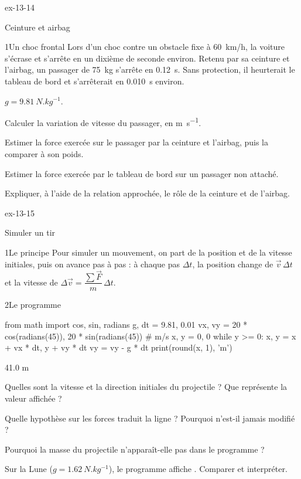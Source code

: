 \begin{blocLivre}{ex-13-14}
\begin{exercice}[3]{Ceinture et airbag}
\begin{docu}{1}{Un choc frontal}
Lors d'un choc contre un obstacle fixe à \qty{60}{km/h}, la voiture s'écrase et s'arrête en un dixième de seconde environ. Retenu par
sa ceinture et l'airbag, un passager de \qty{75}{kg} s'arrête en \qty{0,12}{s}. Sans protection, il heurterait le tableau de bord et s'arrêterait en
\qty{0,010}{s} environ.
\end{docu}
\begin{donnees}
$g=\qty{9,81}{N.kg^{-1}}$.
\end{donnees}
\begin{questions}
\item Calculer la variation de vitesse du passager, en \unit{m.s^{-1}}.
\item Estimer la force exercée sur le passager par la ceinture et l'airbag, puis la comparer à son poids.
\item Estimer la force exercée par le tableau de bord sur un passager non attaché.
\item \initiative Expliquer, à l'aide de la relation approchée, le rôle de la ceinture et de l'airbag.
\end{questions}
\end{exercice}
\end{blocLivre}
\begin{blocLivre}{ex-13-15}
\begin{exercice}[3]{Simuler un tir}
\begin{docu}{1}{Le principe}
Pour simuler un mouvement, on part de la position et de la vitesse initiales, puis on avance pas à pas : à chaque pas $\Delta t$, la
position change de $\vec{v}\,\Delta t$ et la vitesse de $\Delta\vec{v}=\dfrac{\sum\vec{F}}{m}\,\Delta t$.
\end{docu}
\begin{docu}{2}{Le programme}
\begin{python}
from math import cos, sin, radians
g, dt = 9.81, 0.01
vx, vy = 20 * cos(radians(45)), 20 * sin(radians(45))   # m/s
x, y = 0, 0
while y >= 0:
    x, y = x + vx * dt, y + vy * dt
    vy = vy - g * dt
print(round(x, 1), 'm')
\end{python}
\begin{console}
41.0 m
\end{console}
\end{docu}
\begin{questions}
\item {}Quelles sont la vitesse et la direction initiales du projectile ? Que représente la valeur affichée ?
\item Quelle hypothèse sur les forces traduit la ligne  ? Pourquoi  n'est-il jamais modifié ?
\item Pourquoi la masse du projectile n'apparaît-elle pas dans le programme ?
\item \initiative Sur la Lune ($g=\qty{1,62}{N.kg^{-1}}$), le programme affiche . Comparer et interpréter.
\end{questions}
\end{exercice}
\end{blocLivre}
